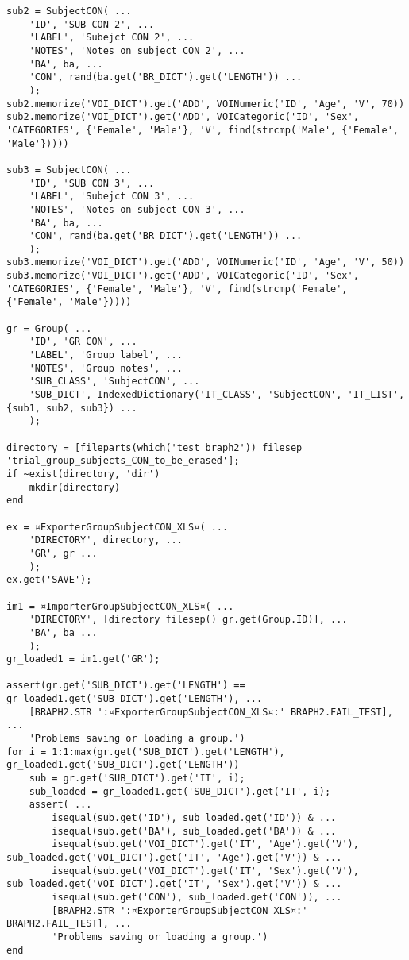\documentclass{tufte-handout}
\begin{document}
\begin{lstlisting}
sub2 = SubjectCON( ...
    'ID', 'SUB CON 2', ...
    'LABEL', 'Subejct CON 2', ...
    'NOTES', 'Notes on subject CON 2', ...
    'BA', ba, ...
    'CON', rand(ba.get('BR_DICT').get('LENGTH')) ...
    );
sub2.memorize('VOI_DICT').get('ADD', VOINumeric('ID', 'Age', 'V', 70))
sub2.memorize('VOI_DICT').get('ADD', VOICategoric('ID', 'Sex', 'CATEGORIES', {'Female', 'Male'}, 'V', find(strcmp('Male', {'Female', 'Male'}))))

sub3 = SubjectCON( ...
    'ID', 'SUB CON 3', ...
    'LABEL', 'Subejct CON 3', ...
    'NOTES', 'Notes on subject CON 3', ...
    'BA', ba, ...
    'CON', rand(ba.get('BR_DICT').get('LENGTH')) ...
    );
sub3.memorize('VOI_DICT').get('ADD', VOINumeric('ID', 'Age', 'V', 50))
sub3.memorize('VOI_DICT').get('ADD', VOICategoric('ID', 'Sex', 'CATEGORIES', {'Female', 'Male'}, 'V', find(strcmp('Female', {'Female', 'Male'}))))

gr = Group( ...
    'ID', 'GR CON', ...
    'LABEL', 'Group label', ...
    'NOTES', 'Group notes', ...
    'SUB_CLASS', 'SubjectCON', ...
    'SUB_DICT', IndexedDictionary('IT_CLASS', 'SubjectCON', 'IT_LIST', {sub1, sub2, sub3}) ...
    );

directory = [fileparts(which('test_braph2')) filesep 'trial_group_subjects_CON_to_be_erased'];
if ~exist(directory, 'dir')
    mkdir(directory)
end

ex = ¤ExporterGroupSubjectCON_XLS¤( ...
    'DIRECTORY', directory, ...
    'GR', gr ...
    );
ex.get('SAVE');

im1 = ¤ImporterGroupSubjectCON_XLS¤( ...
    'DIRECTORY', [directory filesep() gr.get(Group.ID)], ...
    'BA', ba ...
    );
gr_loaded1 = im1.get('GR');

assert(gr.get('SUB_DICT').get('LENGTH') == gr_loaded1.get('SUB_DICT').get('LENGTH'), ...
	[BRAPH2.STR ':¤ExporterGroupSubjectCON_XLS¤:' BRAPH2.FAIL_TEST], ...
    'Problems saving or loading a group.')
for i = 1:1:max(gr.get('SUB_DICT').get('LENGTH'), gr_loaded1.get('SUB_DICT').get('LENGTH'))
    sub = gr.get('SUB_DICT').get('IT', i);
    sub_loaded = gr_loaded1.get('SUB_DICT').get('IT', i);    
    assert( ...
        isequal(sub.get('ID'), sub_loaded.get('ID')) & ...
        isequal(sub.get('BA'), sub_loaded.get('BA')) & ... 
        isequal(sub.get('VOI_DICT').get('IT', 'Age').get('V'), sub_loaded.get('VOI_DICT').get('IT', 'Age').get('V')) & ... 
        isequal(sub.get('VOI_DICT').get('IT', 'Sex').get('V'), sub_loaded.get('VOI_DICT').get('IT', 'Sex').get('V')) & ...
        isequal(sub.get('CON'), sub_loaded.get('CON')), ...
        [BRAPH2.STR ':¤ExporterGroupSubjectCON_XLS¤:' BRAPH2.FAIL_TEST], ...
        'Problems saving or loading a group.')    
end


\end{lstlisting}
\end{document}
